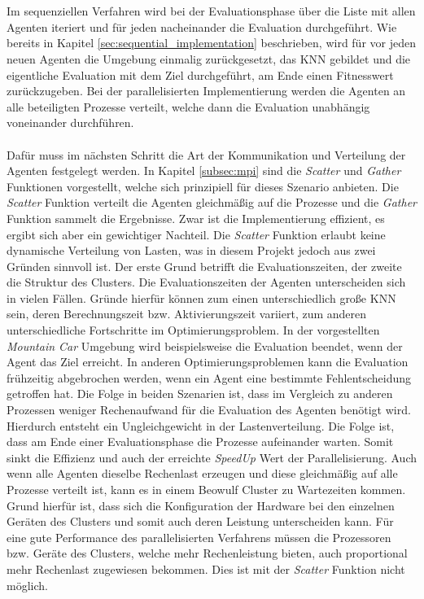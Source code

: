 \\\\
Im sequenziellen Verfahren wird bei der Evaluationsphase über die Liste mit allen Agenten iteriert und für jeden nacheinander die Evaluation durchgeführt. Wie bereits in Kapitel \ref{sec:sequential_implementation} beschrieben, wird für vor jeden neuen Agenten die Umgebung einmalig zurückgesetzt, das \ac{KNN} gebildet und die eigentliche Evaluation mit dem Ziel durchgeführt, am Ende einen Fitnesswert zurückzugeben. Bei der parallelisierten Implementierung werden die Agenten an alle beteiligten Prozesse verteilt, welche dann die Evaluation unabhängig voneinander durchführen. 
\\\\
Dafür muss im nächsten Schritt die Art der Kommunikation und Verteilung der Agenten festgelegt werden. In Kapitel \ref{subsec:mpi} sind die \emph{Scatter} und \emph{Gather} Funktionen vorgestellt, welche sich prinzipiell für dieses Szenario anbieten. Die \emph{Scatter} Funktion verteilt die Agenten gleichmäßig auf die Prozesse und die \emph{Gather} Funktion sammelt die Ergebnisse. Zwar ist die Implementierung effizient, es ergibt sich aber ein gewichtiger Nachteil. Die \emph{Scatter} Funktion erlaubt keine dynamische Verteilung von Lasten, was in diesem Projekt jedoch aus zwei Gründen sinnvoll ist. Der erste Grund betrifft die Evaluationszeiten, der zweite die Struktur des Clusters. Die Evaluationszeiten der Agenten unterscheiden sich in vielen Fällen. Gründe hierfür können zum einen unterschiedlich große \ac{KNN} sein, deren Berechnungszeit bzw. Aktivierungszeit variiert, zum anderen unterschiedliche Fortschritte im Optimierungsproblem. In der vorgestellten \emph{Mountain Car} Umgebung wird beispielsweise die Evaluation beendet, wenn der Agent das Ziel erreicht. In anderen Optimierungsproblemen kann die Evaluation frühzeitig abgebrochen werden, wenn ein Agent eine bestimmte Fehlentscheidung getroffen hat. Die Folge in beiden Szenarien ist, dass im Vergleich zu anderen Prozessen weniger Rechenaufwand für die Evaluation des Agenten benötigt wird. Hierdurch entsteht ein Ungleichgewicht in der Lastenverteilung. Die Folge ist, dass am Ende einer Evaluationsphase die Prozesse aufeinander warten. Somit sinkt die Effizienz und auch der erreichte \emph{SpeedUp} Wert der Parallelisierung. Auch wenn alle Agenten dieselbe Rechenlast erzeugen und diese gleichmäßig auf alle Prozesse verteilt ist, kann es in einem Beowulf Cluster zu Wartezeiten kommen. Grund hierfür ist, dass sich die Konfiguration der Hardware bei den einzelnen Geräten des Clusters und somit auch deren Leistung unterscheiden kann. Für eine gute Performance des parallelisierten Verfahrens müssen die Prozessoren bzw. Geräte des Clusters, welche mehr Rechenleistung bieten, auch proportional mehr Rechenlast zugewiesen bekommen. Dies ist mit der \emph{Scatter} Funktion nicht möglich.
